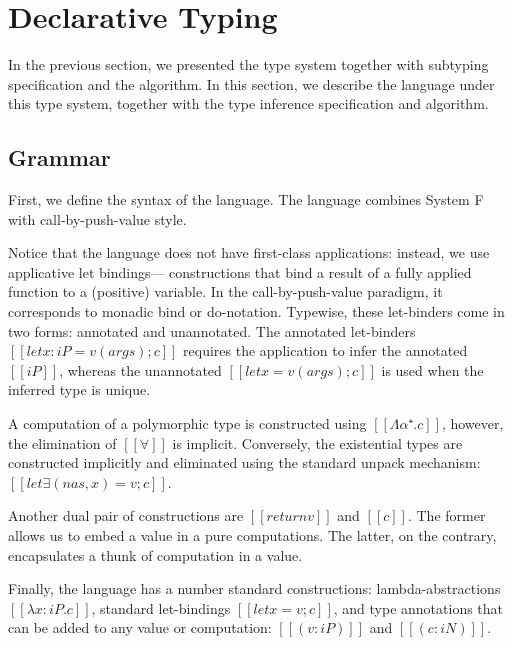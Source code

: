 \documentclass[a4,natbib=false]{article}
\begin{document}
\newpage

\section{Declarative Typing}

In the previous section, we presented the 
type system together with subtyping specification 
and the algorithm. In this section, 
we describe the language under this type system, 
together with the type inference specification
and algorithm.  

\subsection{Grammar}

First, we define the syntax of the language.
The language combines System F with call-by-push-value 
style. 
\begin{definition}
  \hfill
  \begin{multicols}{2}
    \ottgrammartabular{
      \ottc\ottinterrule
    }

    \ottgrammartabular{
      \ottv\ottinterrule
    }
  \end{multicols}
\end{definition}
Notice that the language does not have
first-class applications: instead, 
we use applicative let bindings---
constructions that bind a result of
a fully applied function to a (positive) 
variable.
In the call-by-push-value paradigm, 
it corresponds to monadic bind or do-notation. 
Typewise, these let-binders come in two forms:
annotated and unannotated. The annotated let-binders
$[[let x:iP = v(args); c]]$ 
requires the application to infer the annotated
$[[iP]]$, whereas the unannotated 
$[[let x = v(args); c]]$ 
is used when the inferred type is unique. 

A computation of a polymorphic type is constructed 
using $[[Λα⁺ . c]]$, however, the elimination of $[[∀]]$
is implicit. Conversely, the existential types
are constructed implicitly and eliminated 
using the standard unpack mechanism:
$[[let∃ (nas, x) = v; c]]$.

Another dual pair of constructions are 
$[[return v]]$ and $[[{c}]]$. 
The former allows us to embed a value in a pure 
computations. The latter, on the contrary,
encapsulates a thunk of computation in a value. 

Finally, the language has a number standard constructions:
lambda-abstractions $[[λx:iP.c]]$,
standard let-bindings $[[let x = v; c]]$,
and type annotations that can be added to any value or computation:
$[[(v:iP)]]$ and $[[(c:iN)]]$.
\end{document}
